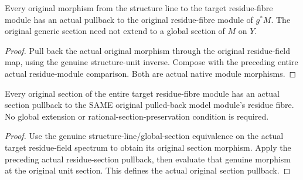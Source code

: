 \begin{definition}
\label{berkovich:actual-residue-section-hom-pullback}
\leanok
{}
Every original morphism from the structure line to the target residue-fibre
module has an actual pullback to the original residue-fibre module of $g^*M$.
The original generic section need not extend to a global section of $M$ on $Y$.
\end{definition}
\begin{proof}
Pull back the actual original morphism through the original residue-field map,
using the genuine structure-unit inverse. Compose with the preceding entire
actual residue-module comparison. Both are actual native module morphisms.
\end{proof}

\begin{definition}
\label{berkovich:actual-residue-section-pullback}
\leanok
{}
Every original section of the entire target residue-fibre module has an actual
section pullback to the SAME original pulled-back model module's residue fibre.
No global extension or rational-section-preservation condition is required.
\end{definition}
\begin{proof}
Use the genuine structure-line/global-section equivalence on the actual target
residue-field spectrum to obtain its original section morphism. Apply the
preceding actual residue-section pullback, then evaluate that genuine morphism
at the original unit section. This defines the actual original section pullback.
\end{proof}
